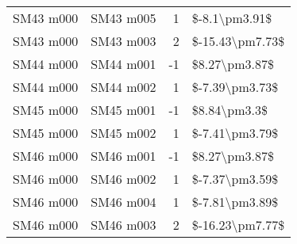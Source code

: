 \begin{longtable}{llrl}
 SM43 m000 &     SM43 m005 &       1 &    \$-8.1\textbackslash pm3.91\$ \\
 SM43 m000 &     SM43 m003 &       2 &  \$-15.43\textbackslash pm7.73\$ \\
 SM44 m000 &     SM44 m001 &      -1 &    \$8.27\textbackslash pm3.87\$ \\
 SM44 m000 &     SM44 m002 &       1 &   \$-7.39\textbackslash pm3.73\$ \\
 SM45 m000 &     SM45 m001 &      -1 &     \$8.84\textbackslash pm3.3\$ \\
 SM45 m000 &     SM45 m002 &       1 &   \$-7.41\textbackslash pm3.79\$ \\
 SM46 m000 &     SM46 m001 &      -1 &    \$8.27\textbackslash pm3.87\$ \\
 SM46 m000 &     SM46 m002 &       1 &   \$-7.37\textbackslash pm3.59\$ \\
 SM46 m000 &     SM46 m004 &       1 &   \$-7.81\textbackslash pm3.89\$ \\
 SM46 m000 &     SM46 m003 &       2 &  \$-16.23\textbackslash pm7.77\$ \\
\end{longtable}
